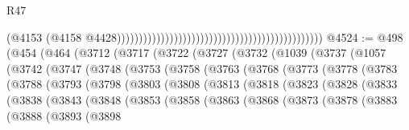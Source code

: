 \begin{lexlean}{R47}
\begin{coremodule}
                                                                                              (@4153
                                                                                                (@4158
                                                                                                  @4428)))))))))))))))))))))))))))))))))))))))))))))))
@4524 := @498
    (@454
      (@464
        (@3712
          (@3717
            (@3722
              (@3727
                (@3732
                  (@1039
                    (@3737
                      (@1057
                        (@3742
                          (@3747
                            (@3748
                              (@3753
                                (@3758
                                  (@3763
                                    (@3768
                                      (@3773
                                        (@3778
                                          (@3783
                                            (@3788
                                              (@3793
                                                (@3798
                                                  (@3803
                                                    (@3808
                                                      (@3813
                                                        (@3818
                                                          (@3823
                                                            (@3828
                                                              (@3833
                                                                (@3838
                                                                  (@3843
                                                                    (@3848
                                                                      (@3853
                                                                        (@3858
                                                                          (@3863
                                                                            (@3868
                                                                              (@3873
                                                                                (@3878
                                                                                  (@3883
                                                                                    (@3888
                                                                                      (@3893
                                                                                        (@3898

\end{coremodule}
\end{lexlean}
